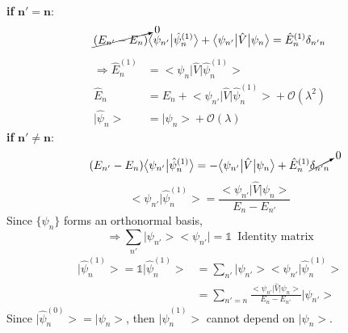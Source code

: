 \documentclass[12pt]{article}
\begin{document}
\textbf{if} $\mathbf{n'= n}$:
\begin{equation*}
	\cancelto{0}{(E_{n'}-E_n)} \big< \psi_{n'} \big|\hat{\psi}^{(1)}_n \big> + \big < \psi_{n'} \big| \hat{V}\big|\psi_n \big>
	= \hat{E}^{(1)}_n \delta_{n'n}
\end{equation*}
\begin{align}
	\Longrightarrow \hat{E}^{(1)}_n & = \big < \psi_{n} \big| \hat{V}\big|\hat{\psi}^{(1)}_n \big>\nonumber\\
	\hat{E}_n & = E_n + \big < \psi_{n'} \big| \hat{V}\big|\hat{\psi}^{(1)}_n \big> + \mathcal{O}(\lambda^2)\nonumber\\
	\big | \hat{\psi}_n \big > & = \big| \psi_n \big> + \mathcal{O} (\lambda)
\end{align}
\textbf{if} $\mathbf{n'\neq n}$:
\begin{equation*}
	(E_{n'}-E_n)\big< \psi_{n'} \big|\hat{\psi}^{(1)}_n \big> = -\big < \psi_{n'} \big| \hat{V}\big|\psi_n \big>
	+ \hat{E}^{(1)}_n \cancelto{0}{\delta_{n'n}}
\end{equation*}
\begin{equation}
	\big< \psi_{n'} \big|\hat{\psi}^{(1)}_n \big> = \frac{\big < \psi_{n'} \big| \hat{V}\big|\psi_n \big>}{E_n - E_{n'}}
\end{equation}
Since $\{ \psi_n\}$ forms an orthonormal basis,
\begin{equation*}
	\Longrightarrow \sum_{n'} \big|\psi_{n'} \big> \big< \psi_{n'} \big | = \mathbb{1}\,\,\,\text{Identity matrix}
\end{equation*}
\begin{align}
	\big| \hat{\psi}^{(1)}_n \big > = \mathbb{1} \big|\hat{\psi}^{(1)}_n\big> & = \sum_{n'} \big|\psi_{n'}
	\big> \big < \psi_{n'} | \hat{\psi}^{(1)}_n \big>\nonumber\\
	& = \sum_{n'=n} \frac{\big < \psi_{n'} \big| \hat{V}\big|\psi_n \big>}{E_n- E_{n'}} \big|\psi_{n'} \big> 
\end{align}
Since $\big |\hat{\psi}^{(0)}_n \big> = \big| \psi_{n} \big>$, then $\big |\hat{\psi}^{(1)}_n \big>$
cannot depend on $\big|\psi_n\big>$. 
\newpage
\end{document}
